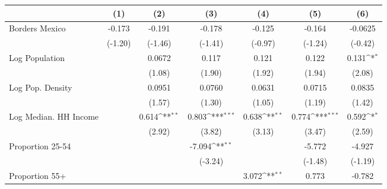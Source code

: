{
\def\sym#1{\ifmmode^{#1}\else\(^{#1}\)\fi}
\begin{tabular}{l*{6}{c}}
\toprule
                    &\multicolumn{1}{c}{(1)}         &\multicolumn{1}{c}{(2)}         &\multicolumn{1}{c}{(3)}         &\multicolumn{1}{c}{(4)}         &\multicolumn{1}{c}{(5)}         &\multicolumn{1}{c}{(6)}         \\
\midrule
Borders Mexico      &      -0.173         &      -0.191         &      -0.178         &      -0.125         &      -0.164         &     -0.0625         \\
                    &     (-1.20)         &     (-1.46)         &     (-1.41)         &     (-0.97)         &     (-1.24)         &     (-0.42)         \\
\addlinespace
Log Population      &                     &      0.0672         &       0.117         &       0.121         &       0.122         &       0.131\sym{*}  \\
                    &                     &      (1.08)         &      (1.90)         &      (1.92)         &      (1.94)         &      (2.08)         \\
\addlinespace
Log Pop. Density    &                     &      0.0951         &      0.0760         &      0.0631         &      0.0715         &      0.0835         \\
                    &                     &      (1.57)         &      (1.30)         &      (1.05)         &      (1.19)         &      (1.42)         \\
\addlinespace
Log Median. HH Income&                     &       0.614\sym{**} &       0.803\sym{***}&       0.638\sym{**} &       0.774\sym{***}&       0.592\sym{*}  \\
                    &                     &      (2.92)         &      (3.82)         &      (3.13)         &      (3.47)         &      (2.59)         \\
\addlinespace
Proportion 25-54    &                     &                     &      -7.094\sym{**} &                     &      -5.772         &      -4.927         \\
                    &                     &                     &     (-3.24)         &                     &     (-1.48)         &     (-1.19)         \\
\addlinespace
Proportion 55+      &                     &                     &                     &       3.072\sym{**} &       0.773         &      -0.782         \\

\end{tabular}}
